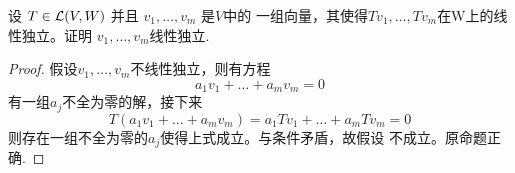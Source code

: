 \begin{problem}{4}
  设 $T\in \mathcal{L}(V,W) $ 并且 $v_1,\dots,v_m$ 是$V$中的
  一组向量，其使得$Tv_1,\dots,Tv_m$在W上的线性独立。证明
 $v_1,\dots,v_m$线性独立.
\end{problem}

\begin{proof}
  假设$v_1,\dots,v_m$不线性独立，则有方程
  \begin{equation*}
    a_1v_1+\dots+a_mv_m = 0
  \end{equation*}
  有一组$a_j$不全为零的解，接下来
  \begin{displaymath}
    T(a_1v_1+\dots+a_mv_m) =a_1Tv_1+\dots+a_mTv_m =0
  \end{displaymath}
  则存在一组不全为零的$a_j$使得上式成立。与条件矛盾，故假设
  不成立。原命题正确.
\end{proof}

